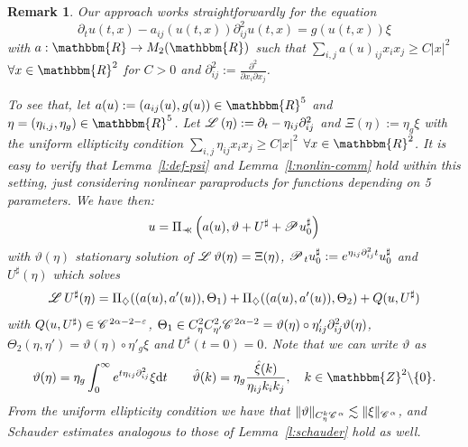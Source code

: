 \documentclass[11pt,reqno]{amsart}
\newcommand{\assign}{:=}
\newcommand{\mathd}{\mathrm{d}}
\newcommand{\precprec}{\prec\!\!\!\prec}
\newtheorem{remark}[theorem]{Remark}
\newcommand{\CC}{\mathscr{C} \hspace{.1em}}
\newcommand{\LL}{\mathscr{L} \hspace{.2em}}
\newcommand{\PP}{\mathscr{P} \hspace{.1em}}
\begin{document}
\begin{remark}
  \label{r:vector-form}Our approach works straightforwardly for the equation
  \[ \partial_t u (t, x) - a_{i j} (u (t, x)) \partial^2_{i j} u (t, x) = g (u
     (t, x)) \xi \]
  with $a : \mathbbm{R} \rightarrow M_2 (\mathbbm{R})$ such that $\sum_{i, j}
  a (u)_{i j} x_i x_j \geqslant C | x |^2$ $\forall x \in \mathbbm{R}^2$ for
  $C > 0$ and $\partial^2_{i j} \assign \frac{\partial^2}{\partial x_i
  \partial x_j}$.
  
  To see that, let $a (u) \assign (a_{i j} (u), g (u)) \in \mathbbm{R}^5$ and
  $\eta = (\eta_{i, j}, \eta_g) \in \mathbbm{R}^5$. Let $\LL (\eta) \assign
  \partial_t - \eta_{i j} \partial^2_{i j}$ and $\Xi (\eta) \assign \eta_g
  \xi$ with the uniform ellipticity condition $\sum_{i, j} \eta_{i j} x_i x_j
  \geqslant C | x |^2$ $\forall x \in \mathbbm{R}^2$. It is easy to verify
  that Lemma~\ref{l:def-psi} and Lemma~\ref{l:nonlin-comm} hold within this
  setting, just considering nonlinear paraproducts for functions depending on
  5 parameters. We have then:
  \[ u = \Pi_{\precprec} \left( a (u), \vartheta + U^{\sharp} + \PP
     u_0^{\sharp} \right) \]
  with $\vartheta (\eta)$ stationary solution of $\LL \vartheta (\eta) = \Xi
  (\eta)$, $\PP_t u_0^{\sharp} \assign e^{\eta_{i j} \partial^2_{i j} t}
  u_0^{\sharp}$ and $U^{\sharp} (\eta)$ which solves
  \[ \LL U^{\sharp} (\eta) = \Pi_{\diamondsuit} ((a (u), a' (u)), \Theta_1) +
     \Pi_{\diamondsuit} ((a (u), a' (u)), \Theta_2) + Q (u, U^{\sharp}) \]
  with $Q (u, U^{\sharp}) \in \CC^{2 \alpha - 2 - \varepsilon}$, $\Theta_1 \in
  C^2_{\eta} C^2_{\eta'} \CC^{2 \alpha - 2} = \vartheta (\eta) \circ \eta'_{i
  j} \partial^2_{i j} \vartheta (\eta)$, $\Theta_2 (\eta, \eta') = \vartheta
  (\eta) \circ \eta'_g \xi$ and $U^{\sharp} (t = 0) = 0$. Note that we can
  write $\vartheta$ as
  \[ \vartheta (\eta) = \eta_g \int_0^{\infty} e^{t \eta_{i j} \partial^2_{i
     j}} \xi \mathd t \qquad \hat{\vartheta} (k) = \eta_g \frac{\hat{\xi}
     (k)}{\eta_{i j} k_i k_j}, \quad k \in \mathbbm{Z}^2 \backslash \{ 0 \} .
  \]
  From the uniform ellipticity condition we have that $\| \vartheta
  \|_{C_{\eta}^k \CC^{\alpha}} \lesssim \| \xi \|_{\CC^{\alpha}}$, and
  Schauder estimates analogous to those of Lemma~\ref{l:schauder} hold as
  well.
  

\end{remark}
\end{document}
